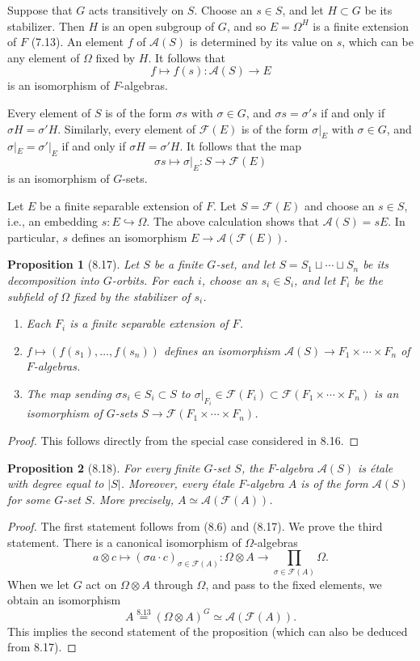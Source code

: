 \documentclass[UTF8,11pt]{ctexart}
\newtheorem*{proposition}{Proposition}
\theoremstyle{definition}
\begin{document}
Suppose that $G$ acts transitively on $S$. Choose an $s\in S$, and let $H\subset G$ be its stabilizer. Then $H$ is an open subgroup of $G$, and so $E=\Omega^H$ is a finite extension of $F$ (7.13). An element $f$ of $\mathcal A(S)$ is determined by its value on $s$, which can be any element of $\Omega$ fixed by $H$. It follows that
\[f\longmapsto f(s):\mathcal A(S)\longrightarrow E\]
is an isomorphism of $F$-algebras.

Every element of $S$ is of the form $\sigma s$ with $\sigma\in G$, and $\sigma s=\sigma's$ if and only if $\sigma H=\sigma'H$. Similarly, every element of $\mathcal F(E)$ is of the form $\sigma|_E$ with $\sigma\in G$, and $\sigma|_E=\sigma'|_E$ if and only if $\sigma H=\sigma'H$. It follows that the map
\[\sigma s\longmapsto\sigma|_E:S\longrightarrow\mathcal F(E)\]
is an isomorphism of $G$-sets.

Let $E$ be a finite separable extension of $F$. Let $S=\mathcal F(E)$ and choose an $s\in S$, i.e., an embedding $s:E\hookrightarrow\Omega$. The above calculation shows that $\mathcal A(S)=sE$. In particular, $s$ defines an isomorphism $E\to\mathcal A(\mathcal F(E))$.

\begin{proposition}[8.17]
Let $S$ be a finite $G$-set, and let $S=S_1\sqcup\cdots\sqcup S_n$ be its decomposition into $G$-orbits. For each $i$, choose an $s_i\in S_i$, and let $F_i$ be the subfield of $\Omega$ fixed by the stabilizer of $s_i$.
\begin{enumerate}[label=(\alph*)]
\item Each $F_i$ is a finite separable extension of $F$.
\item $f\mapsto(f(s_1),\ldots,f(s_n))$ defines an isomorphism $\mathcal A(S)\to F_1\times\cdots\times F_n$ of $F$-algebras.
\item The map sending $\sigma s_i\in S_i\subset S$ to $\sigma|_{F_i}\in\mathcal F(F_i)\subset\mathcal F(F_1\times\cdots\times F_n)$ is an isomorphism of $G$-sets $S\to\mathcal F(F_1\times\cdots\times F_n)$.
\end{enumerate}
\end{proposition}
\begin{proof}
This follows directly from the special case considered in 8.16.
\end{proof}
\begin{proposition}[8.18]
For every finite $G$-set $S$, the $F$-algebra $\mathcal A(S)$ is \'etale with degree equal to $|S|$. Moreover, every \'etale $F$-algebra $A$ is of the form $\mathcal A(S)$ for some $G$-set $S$. More precisely, $A\simeq\mathcal A(\mathcal F(A))$.
\end{proposition}
\begin{proof}
The first statement follows from (8.6) and (8.17). We prove the third statement. There is a canonical isomorphism of $\Omega$-algebras
\[a\otimes c\longmapsto(\sigma a\cdot c)_{\sigma\in\mathcal F(A)}:\Omega\otimes A\longrightarrow\prod_{\sigma\in\mathcal F(A)}\Omega.\]
When we let $G$ act on $\Omega\otimes A$ through $\Omega$, and pass to the fixed elements, we obtain an isomorphism
\[A\overset{8.13}{=}(\Omega\otimes A)^G\simeq\mathcal A(\mathcal F(A)).\]
This implies the second statement of the proposition (which can also be deduced from 8.17).
\end{proof}
\end{document}
